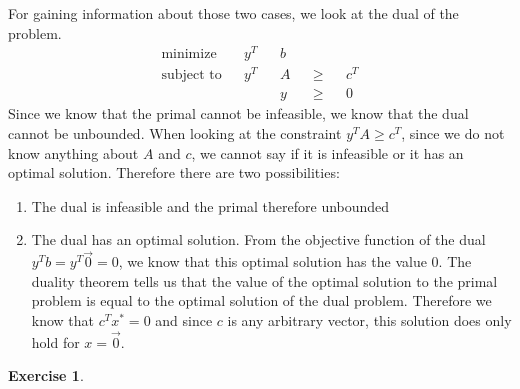 \documentclass[a4paper,12pt,headsepline]{scrartcl}
\newtheorem{aufgabe}{Exercise}
\begin{document}
For gaining information about those two cases, we look at the dual of the problem.
\begin{align*}
  \text{minimize}   & & y^T & & b & &     & &     \\
  \text{subject to} & & y^T & & A & & \ge & & c^T \\
                    & &     & & y & & \ge & & 0
\end{align*}
Since we know that the primal cannot be infeasible, we know that the dual cannot be unbounded.
When looking at the constraint $y^TA\ge c^T$, since we do not know anything about $A$ and $c$, we cannot say if it is infeasible or it has an optimal solution.
Therefore there are two possibilities:
\begin{enumerate}
  \item The dual is infeasible and the primal therefore unbounded
  \item The dual has an optimal solution.
    From the objective function of the dual $y^Tb=y^T\vec 0=0$, we know that this optimal solution has the value 0.
    The duality theorem tells us that the value of the optimal solution to the primal problem is equal to the optimal solution of the dual problem.
    Therefore we know that $c^Tx^*=0$ and since $c$ is any arbitrary vector, this solution does only hold for $x=\vec 0$.
\end{enumerate}

\newpage

\begin{aufgabe}
\end{aufgabe}
\end{document}
